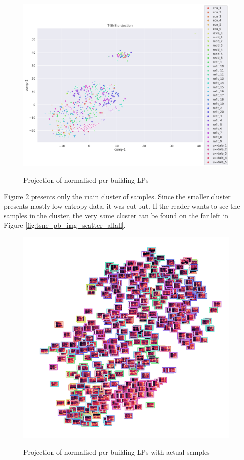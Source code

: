 \begin{figure}[H]
	\centering
	\caption{Projection of normalised per-building LPs}
	\includegraphics[width=1.2\textwidth]{Figures/TSNE/TSNE_per_building/all/scatter_all_all.png}
	\label{fig:tsne_pb_scatter_all_all}
\end{figure}

Figure \ref{fig:tsne_pb_img_norm_scatter_allall} presents only the main cluster of samples.
Since the smaller cluster presents mostly low entropy data, it was cut out. 
If the reader wants to see the samples in the cluster, the very same cluster can be found on the far left in Figure \ref{fig:tsne_pb_img_scatter_allall}.

\begin{figure}[H]
	\centering
	\caption{Projection of normalised per-building LPs with actual samples}
	\includegraphics[width=.9\textwidth]{Figures/TSNE/TSNE_per_building/all/img_scatter_allall.png}
	\label{fig:tsne_pb_img_norm_scatter_allall}
\end{figure}


